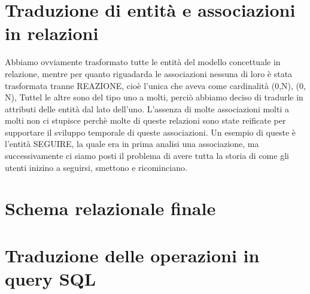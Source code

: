 \documentclass[a4paper,12pt]{report}
\begin{document}
\section{Traduzione di entità e associazioni in relazioni}
Abbiamo ovviamente trasformato tutte le entità del modello concettuale in relazione, mentre per quanto riguadarda le associazioni nessuna di loro è stata trasformata tranne REAZIONE, cioè l'unica che aveva come cardinalità (0,N), (0, N), Tuttel le altre sono del tipo uno a molti, perciò abbiamo deciso di tradurle in attributi delle entità dal lato dell'uno. L'assenza di molte associazioni molti a molti non ci stupisce perchè molte di queste relazioni sono state reificate per supportare il sviluppo temporale di queste associazioni. Un esempio di queste è l'entità SEGUIRE, la quale era in prima analisi una associazione, ma successivamente ci siamo posti il problema di avere tutta la storia di come gli utenti inizino a seguirsi, smettono e ricominciano.
\section{Schema relazionale finale}
\section{Traduzione delle operazioni in query SQL}
\end{document}

